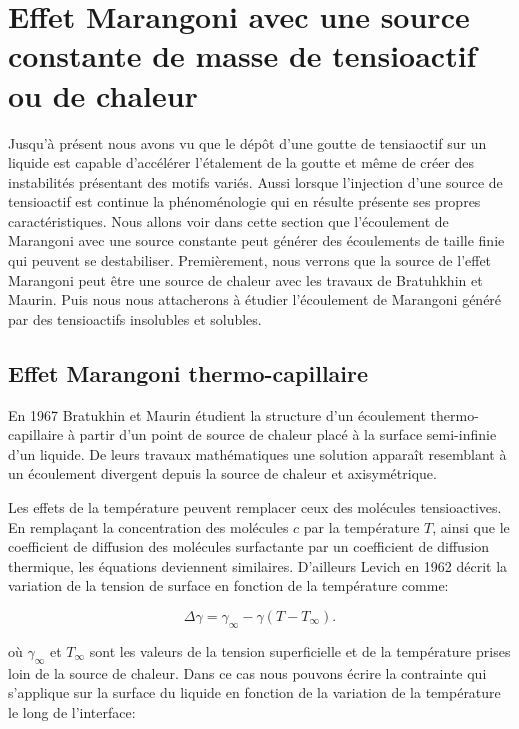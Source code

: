 \section{Effet Marangoni avec une source constante de masse de tensioactif ou de chaleur}
Jusqu'à présent nous avons vu que le dépôt d'une goutte de tensiaoctif sur un liquide est capable d'accélérer l'étalement de la goutte et même de créer des instabilités présentant des motifs variés. Aussi lorsque l'injection d'une source de tensioactif est continue la phénoménologie qui en résulte présente ses propres caractéristiques. Nous allons voir dans cette section que l'écoulement de Marangoni avec une source constante peut générer des écoulements de taille finie qui peuvent se destabiliser. Premièrement, nous verrons que la source de l'effet Marangoni peut être une source de chaleur avec les travaux de Bratuhkhin et Maurin. Puis nous nous attacherons à étudier l'écoulement de Marangoni généré par des tensioactifs insolubles et solubles. 


\subsection{Effet Marangoni thermo-capillaire}
  En 1967 Bratukhin et Maurin étudient la structure d'un écoulement thermo-capillaire à partir d'un point de source de chaleur placé à la surface semi-infinie d'un liquide. De leurs travaux mathématiques \cite{Bratukhin1967, Bratukhin1982} une solution apparaît resemblant à un écoulement divergent depuis la source de chaleur et axisymétrique.
  
  
  Les effets de la température peuvent remplacer ceux des molécules tensioactives. En remplaçant la concentration des molécules $c$ par la température $T$, ainsi que le coefficient de diffusion des molécules surfactante par un coefficient de diffusion thermique, les équations deviennent similaires. D'ailleurs Levich en 1962 décrit la variation de la tension de surface en fonction de la température comme: 

  \begin{equation}
    \Delta \gamma = \gamma_{\infty}-\gamma\left(T-T_{\infty}\right)\label{eq:Levich1962}.
  \end{equation}  

  où $\gamma_{\infty}$ et $T_{\infty}$ sont les valeurs de la tension superficielle et de la température prises loin de la source de chaleur. Dans ce cas nous pouvons écrire la contrainte qui s'applique sur la surface du liquide en fonction de la variation de la température le long de l'interface: 

